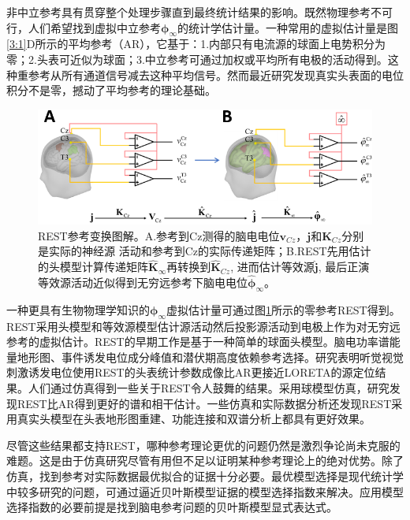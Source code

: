 非中立参考具有贯穿整个处理步骤直到最终统计结果的影响。既然物理参考不可行，人们希望找到虚拟中立参考$\mathbf{\phi}_{\infty}$的统计学估计量。一种常用的虚拟估计量是图\ref{3:1}D所示的平均参考（AR），它基于：1.内部只有电流源的球面上电势积分为零；2.头表可近似为球面；3.中立参考可通过加权或平均所有电极的活动得到。这
种重参考从所有通道信号减去这种平均信号。然而最近研究发现真实头表面的电位积分不是零，撼动了平均参考的理论基础。
\begin{figure}[!h]
	\centering
	\includegraphics[width=15cm]{pic/Frontier/figure2.png}
	\caption{REST参考变换图解。A.参考到Cz测得的脑电电位$\mathbf{v}_{Cz}$，$\mathbf{j}$和$\mathbf{K}_{Cz}$分别是实际的神经源
	活动和参考到Cz的实际传递矩阵；B.REST先用估计的头模型计算传递矩阵$\hat{\mathbf{K}}_\infty$再转换到$\hat{\mathbf{K}}_{Cz}$, 进而估计等效源$\hat{\mathbf{j}}$, 最后正演等效源活动近似得到无穷远参考下脑电电位$\hat{\mathbf{\phi}}_\infty$。}
	\label{3:2}
\end{figure}
一种更具有生物物理学知识的$\mathbf{\phi}_{\infty}$虚拟估计量可通过图\ref{3:2}所示的零参考REST得到。REST采用头模型和等效源模型估计源活动然后投影源活动到电极上作为对无穷远参考的虚拟估计。REST的早期工作是基于一种简单的球面头模型。脑电功率谱能量地形图、事件诱发电位成分峰值和潜伏期高度依赖参考选择。研究表明听觉视觉刺激诱发电位使用REST的头表统计参数成像比AR更接近LORETA的源定位结果。人们通过仿真得到一些关于REST令人鼓舞的结果。采用球模型仿真，研究发现REST比AR得到更好的谱和相干估计。一些仿真和实际数据分析还发现REST采用真实头模型在头表地形图重建、功能连接和双谱分析上都具有更好效果。

尽管这些结果都支持REST，哪种参考理论更优的问题仍然是激烈争论尚未克服的难题。这是由于仿真研究尽管有用但不足以证明某种参考理论上的绝对优势。除了仿真，找到参考对实际数据最优拟合的证据十分必要。最优模型选择是现代统计学中较多研究的问题，可通过逼近贝叶斯模型证据的模型选择指数来解决。应用模型选择指数的必要前提是找到脑电参考问题的贝叶斯模型显式表达式。

